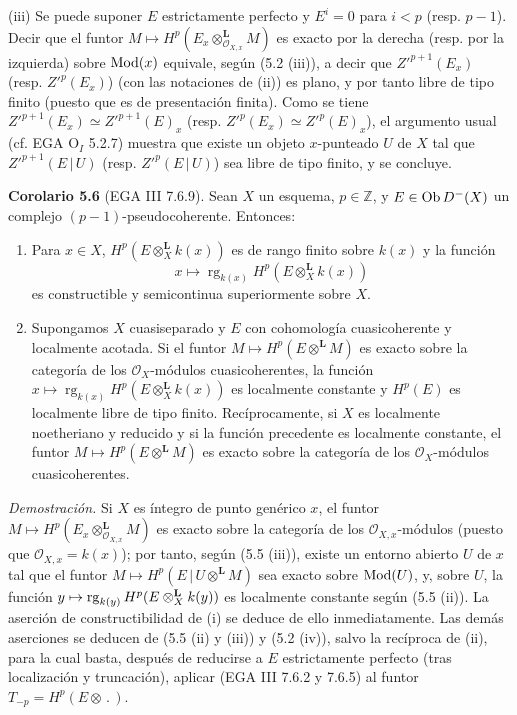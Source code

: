 (iii) Se puede suponer \(E\) estrictamente perfecto y \(E^i=0\) para \(i<p\) (resp. \(p-1\)). Decir que el funtor \(M\mapsto H^p(E_x\otimes_{\mathcal O_{X,x}}^{\mathbf L}M)\) es exacto por la derecha (resp. por la izquierda) sobre \(\Mod(x)\) equivale, según (5.2 (iii)), a decir que \(Z'^{p+1}(E_x)\) (resp. \(Z'^p(E_x)\)) (con las notaciones de (ii)) es plano, y por tanto libre de tipo finito (puesto que es de presentación finita). Como se tiene \(Z'^{p+1}(E_x)\simeq Z'^{p+1}(E)_x\) (resp. \(Z'^p(E_x)\simeq Z'^p(E)_x\)), el argumento usual (cf. EGA \(\mathrm O_I\) 5.2.7) muestra que existe un objeto \(x\)-punteado \(U\) de \(X\) tal que \(Z'^{p+1}(E\,|\,U)\) (resp. \(Z'^p(E\,|\,U)\)) sea libre de tipo finito, y se concluye.

\textbf{Corolario 5.6} (EGA III 7.6.9). Sean \(X\) un esquema, \(p\in\mathbb Z\), y \(E\in\Ob D^{-}(X)\) un complejo \((p-1)\)-pseudocoherente. Entonces:
\begin{enumerate}[label=(\roman*)]
\item Para \(x\in X\), \(H^p(E\otimes_X^{\mathbf L}k(x))\) es de rango finito sobre \(k(x)\) y la función
\[
 x\longmapsto\operatorname{rg}_{k(x)}H^p(E\otimes_X^{\mathbf L}k(x))
\]
es constructible y semicontinua superiormente sobre \(X\).
\item Supongamos \(X\) cuasiseparado y \(E\) con cohomología cuasicoherente y localmente acotada. Si el funtor \(M\mapsto H^p(E\otimes^{\mathbf L}M)\) es exacto sobre la categoría de los \(\mathcal O_X\)-módulos cuasicoherentes, la función \(x\mapsto\operatorname{rg}_{k(x)}H^p(E\otimes_X^{\mathbf L}k(x))\) es localmente constante y \(H^p(E)\) es localmente libre de tipo finito. Recíprocamente, si \(X\) es localmente noetheriano y reducido y si la función precedente es localmente constante, el funtor \(M\mapsto H^p(E\otimes^{\mathbf L}M)\) es exacto sobre la categoría de los \(\mathcal O_X\)-módulos cuasicoherentes.
\end{enumerate}

\emph{Demostración.} Si \(X\) es íntegro de punto genérico \(x\), el funtor \(M\mapsto H^p(E_x\otimes_{\mathcal O_{X,x}}^{\mathbf L}M)\) es exacto sobre la categoría de los \(\mathcal O_{X,x}\)-módulos (puesto que \(\mathcal O_{X,x}=k(x)\)); por tanto, según (5.5 (iii)), existe un entorno abierto \(U\) de \(x\) tal que el funtor \(M\mapsto H^p(E\,|\,U\otimes^{\mathbf L}M)\) sea exacto sobre \(\Mod(U)\), y, sobre \(U\), la función \(y\mapsto\operatorname{rg}_{\sisi{k(x)}{k(y)}}H^p(E\otimes_X^{\mathbf L}k(y))\) es localmente constante según (5.5 (ii)). La aserción de constructibilidad de (i) se deduce de ello inmediatamente. Las demás aserciones se deducen de (5.5 (ii) y (iii)) y (5.2 (iv)), salvo la recíproca de (ii), para la cual basta, después de reducirse a \(E\) estrictamente perfecto (tras localización y truncación), aplicar (EGA III 7.6.2 y 7.6.5) al funtor \(T_{-p}=H^p(E\otimes\,.\,)\).

